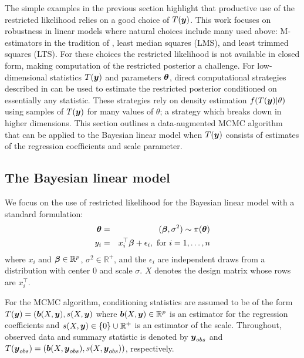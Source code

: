 \documentclass[12pt]{article}
\def\bth{\mbox{\boldmath $\theta$}}
\def\bbeta{\mbox{\boldmath $\beta$}}
\newcommand{\by}{\mbox{\boldmath $y$}}
\newcommand{\bb}{\mbox{\boldmath $b$}}
\begin{document}
The simple examples in the previous section highlight that productive use of the restricted likelihood relies on a good choice of $T(\by)$. This work focuses on robustness in linear models where natural choices include many used above:  M-estimators in the tradition of \cite{huber1964}, least median squares (LMS), and least trimmed squares (LTS). For these choices the restricted likelihood is not available in closed form, making computation of the restricted posterior a challenge. For low-dimensional statistics $T(\by)$ and parameters $\bth$, direct computational strategies described in \cite{lewis2014} can be used to estimate the restricted posterior conditioned on essentially any statistic.  These strategies rely on density estimation $f(T(\by)|\theta)$ using samples of $T(\by)$ for many values of $\theta$; a strategy which breaks down in higher dimensions. This section outlines a data-augmented MCMC algorithm that can be applied to the Bayesian linear model when $T(\by)$ consists of estimates of the regression coefficients and scale parameter. 

\subsection{The Bayesian linear model}
We focus on the use of restricted likelihood for the Bayesian linear
model with a standard formulation: 
\begin{eqnarray}
\label{LinearModel}
\bth&=&(\bbeta,\sigma^2) \sim  \pi(\bth) 
\nonumber\\
y_i  & =  & x_i^\top \bbeta + \epsilon_i , \mbox{ for } i = 1, \ldots, n 
\end{eqnarray}
where $x_i$ and $\bbeta \in \mathbb{R}^p$, $\sigma^2 \in \mathbb{R}^+$, 
and the $\epsilon_i$ are independent draws from a distribution with center $0$ and scale $\sigma$. $X$ denotes the design matrix whose rows are  $x_i^\top$. 

For the MCMC algorithm,  conditioning statistics are assumed to be of the form $T(\by) = (\bb(X, \by), s(X, \by)$ where $\bb(X, \by)\in \mathbb R^{p}$ is an estimator for the regression coefficients and $s(X, \by)\in \{0\} \cup {\mathbb R}^+$ is an estimator of the scale. Throughout, observed data and summary statistic is denoted by $\by_{obs}$ and $T(\by_{obs})=(\bb(X, \by_{obs}), s(X, \by_{obs}))$, respectively. 
\end{document}
